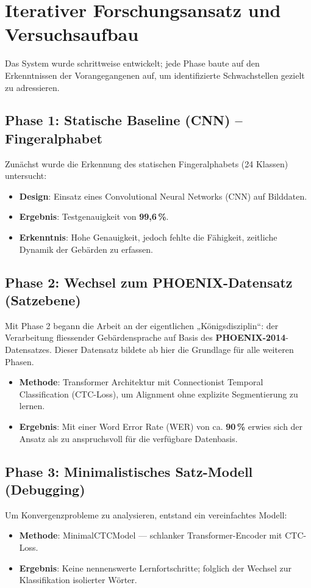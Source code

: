 \section{Iterativer Forschungsansatz und Versuchsaufbau}
\label{sec:methodology_phases}
Das System wurde schrittweise entwickelt; jede Phase baute auf den Erkenntnissen der Vorangegangenen auf, um identifizierte Schwachstellen gezielt zu adressieren.

\subsection{Phase 1: Statische Baseline (CNN) – Fingeralphabet}
Zunächst wurde die Erkennung des statischen Fingeralphabets (24 Klassen) untersucht:
\begin{itemize}
    \item \textbf{Design}: Einsatz eines Convolutional Neural Networks (CNN) auf Bilddaten.
    \item \textbf{Ergebnis}: Testgenauigkeit von \textbf{99,6\,\%}.
    \item \textbf{Erkenntnis}: Hohe Genauigkeit, jedoch fehlte die Fähigkeit, zeitliche Dynamik der Gebärden zu erfassen.
\end{itemize}

\subsection{Phase 2: Wechsel zum PHOENIX-Datensatz (Satzebene)}
Mit Phase 2 begann die Arbeit an der eigentlichen „Königsdisziplin“: der Verarbeitung fliessender Gebärdensprache auf Basis des \textbf{PHOENIX-2014}-Datensatzes. Dieser Datensatz bildete ab hier die Grundlage für alle weiteren Phasen.
\begin{itemize}
    \item \textbf{Methode}: Transformer Architektur mit Connectionist Temporal Classification (CTC-Loss), um Alignment ohne explizite Segmentierung zu lernen.
    \item \textbf{Ergebnis}: Mit einer Word Error Rate (WER) von ca. \textbf{90\,\%} erwies sich der Ansatz als zu anspruchsvoll für die verfügbare Datenbasis.
\end{itemize}

\subsection{Phase 3: Minimalistisches Satz-Modell (Debugging)}
Um Konvergenzprobleme zu analysieren, entstand ein vereinfachtes Modell:
\begin{itemize}
    \item \textbf{Methode}: MinimalCTCModel — schlanker Transformer-Encoder mit CTC-Loss.
    \item \textbf{Ergebnis}: Keine nennenswerte Lernfortschritte; folglich der Wechsel zur Klassifikation isolierter Wörter.
\end{itemize}

